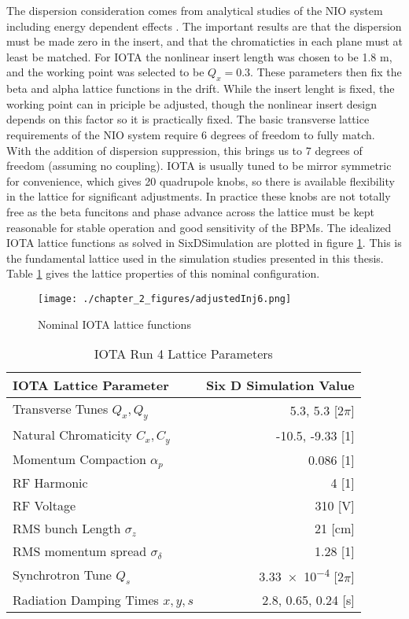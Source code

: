 The dispersion consideration comes from analytical studies of the NIO system including energy dependent effects \cite{webbNIO}. The important results are that the dispersion must be made zero in the insert, and that the chromaticties in each plane must at least be matched. For IOTA the nonlinear insert length was chosen to be 1.8 m, and the working point was selected to be $Q_x=0.3$. These parameters then fix the beta and alpha lattice functions in the drift. While the insert lenght is fixed, the working point can in priciple be adjusted, though the nonlinear insert design depends on this factor so it is practically fixed. The basic transverse lattice requirements of the NIO system require 6 degrees of freedom to fully match. With the addition of dispersion suppression, this brings us to 7 degrees of freedom (assuming no coupling). IOTA is usually tuned to be mirror symmetric for convenience, which gives 20 quadrupole knobs, so there is available flexibility in the lattice for significant adjustments. In practice these knobs are not totally free as the beta funcitons and phase advance across the lattice must be kept reasonable for stable operation and good sensitivity of the BPMs. The idealized IOTA lattice functions as solved in SixDSimulation are plotted in figure \ref{fig:IOTAinj6}. This is the fundamental lattice used in the simulation studies presented in this thesis. Table \ref{tab:IOTAlattice} gives the lattice properties of this nominal configuration.

\begin{figure}
	\centering
	\texttt{[image: ./chapter\_2\_figures/adjustedInj6.png]}
	\caption{Nominal IOTA lattice functions}
	\label{fig:IOTAinj6}
\end{figure}


\begin{table}
    \centering
    \begin{tabular}{lr}
    \toprule
    \textbf{IOTA Lattice Parameter} & \textbf{Six D Simulation Value}\\
    \midrule
    Transverse Tunes $Q_x,Q_y$ & 5.3, 5.3 [2$\pi$]\\ 
    Natural Chromaticity $C_x,C_y$ & -10.5, -9.33 [1]\\
    Momentum Compaction $\alpha_p$ & 0.086 [1]\\
    \midrule
    RF Harmonic & 4 [1]\\
    RF Voltage & 310 [V]\\
    RMS bunch Length $\sigma_z$ & 21 [cm]\\
    \midrule
    RMS momentum spread $\sigma_{\delta}$ & 1.28 [1]\\
    Synchrotron Tune $Q_s$ & \num{3.33e-4} [2$\pi$]\\
    Radiation Damping Times $x,y,s$ & 2.8, 0.65, 0.24 [s]\\
    \bottomrule
    \end{tabular}
    \caption{IOTA Run 4 Lattice Parameters}
    \label{tab:IOTAlattice}
\end{table}

